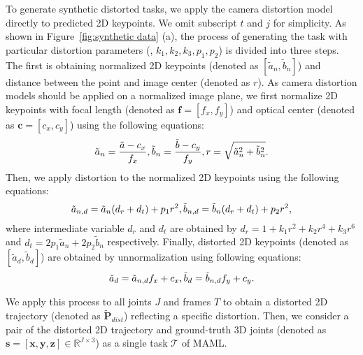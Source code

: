         To generate synthetic distorted tasks, we apply the camera distortion model~\cite{ref38_CamCalibration} directly to predicted 2D keypoints. We omit subscript $t$ and $j$ for simplicity. As shown in Figure~\ref{fig:synthetic data} (a), the process of generating the task with particular distortion parameters (\ie, $k_1,k_2,k_3,p_1,p_2$) is divided into three steps. The first is obtaining normalized 2D keypoints (denoted as $[\tilde{a}_n,\tilde{b}_n]$) and distance between the point and image center (denoted as $r$). As camera distortion models should be applied on a normalized image plane, we first normalize 2D keypoints with focal length (denoted as $\mathbf{f}=[f_x,f_y]$) and optical center (denoted as $\mathbf{c}=[c_x,c_y]$) using the following equations:
        \begin{equation}
            \small
            \tilde{a}_n = \frac{\tilde{a}-c_x}{f_x},\tilde{b}_n = \frac{\tilde{b}-c_y}{f_y},r=\sqrt{\tilde{a}_n^2+\tilde{b}_n^2}.
            \label{eq:hb_1}
        \end{equation}
        Then, we apply distortion to the normalized 2D keypoints using the following equations:
        \begin{equation}
            \small
            \tilde{a}_{n,d} = \tilde{a}_n(d_r+d_t)+p_1r^2,\tilde{b}_{n,d} = \tilde{b}_n(d_r+d_t)+p_2r^2,
            \label{eq:hb_3}
        \end{equation}
        where intermediate variable $d_r$ and $d_t$ are obtained by \small$d_r = 1+k_1r^2+k_2r^4+k_3r^6$ \normalsize and \small$d_t = 2p_1\tilde{a}_n+2p_2\tilde{b}_n$ \normalsize respectively. Finally, distorted 2D keypoints (denoted as $[\tilde{a}_d,\tilde{b}_d]$) are obtained by unnormalization using following equations:
        \begin{equation}
            \small
            \tilde{a}_{d} = \tilde{a}_{n,d}f_x+c_x,\tilde{b}_{d} = \tilde{b}_{n,d}f_y+c_y.
            \label{eq:hb_4}
        \end{equation}
        
        We apply this process to all joints $J$ and frames $T$ to obtain a distorted 2D trajectory (denoted as $\tilde{\mathbf{P}}_{dist}$) reflecting a specific distortion. Then, we consider a pair of the distorted 2D trajectory and ground-truth 3D joints (denoted as $\mathbf{s} = [\mathbf{x},\mathbf{y},\mathbf{z}]\in\mathbb{R}^{J\times3}$) as a single task $\mathcal{T}$ of MAML.
        
